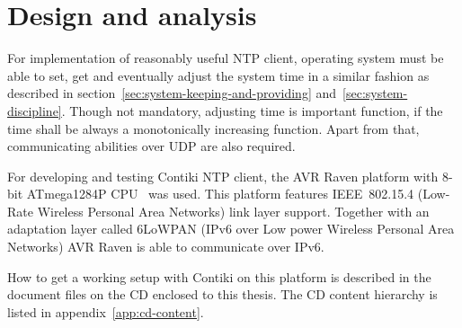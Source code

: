 
\chapter{Design and analysis}
For implementation of reasonably useful NTP client,
operating system must be able to set, get
and eventually adjust the system time in a similar fashion as
described in section~\ref{sec:system-keeping-and-providing} and~\ref{sec:system-discipline}.
Though not mandatory, adjusting time is important function,
if the time shall be always a monotonically increasing function.
Apart from that, communicating abilities over UDP are also required.

For developing and testing Contiki NTP client,
the AVR Raven platform with 8-bit ATmega1284P CPU~\cite{avr-datasheet} was used.
This platform features IEEE~802.15.4 (Low-Rate Wireless Personal Area Networks) link layer support.
Together with an adaptation layer called 6LoWPAN (IPv6 over Low power Wireless Personal Area Networks)
AVR Raven is able to communicate over IPv6.

How to get a working setup with Contiki on this platform is described in
the document files on the CD enclosed to this thesis.
The CD content hierarchy is listed in appendix~\ref{app:cd-content}.




%

